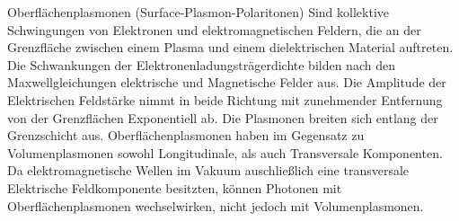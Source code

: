 Oberflächenplasmonen (Surface-Plasmon-Polaritonen) Sind kollektive Schwingungen von Elektronen und elektromagnetischen Feldern, die an der Grenzfläche zwischen einem Plasma und einem dielektrischen Material auftreten. Die Schwankungen der Elektronenladungsträgerdichte bilden nach den Maxwellgleichungen elektrische und Magnetische Felder aus. Die Amplitude der Elektrischen Feldstärke nimmt in beide Richtung mit zunehmender Entfernung von der Grenzflächen Exponentiell ab. Die Plasmonen breiten sich entlang der Grenzschicht aus. Oberflächenplasmonen haben im Gegensatz zu Volumenplasmonen sowohl Longitudinale, als auch Transversale Komponenten. Da elektromagnetische Wellen im Vakuum auschließlich eine transversale Elektrische Feldkomponente besitzten, können Photonen mit Oberflächenplasmonen wechselwirken, nicht jedoch mit Volumenplasmonen.